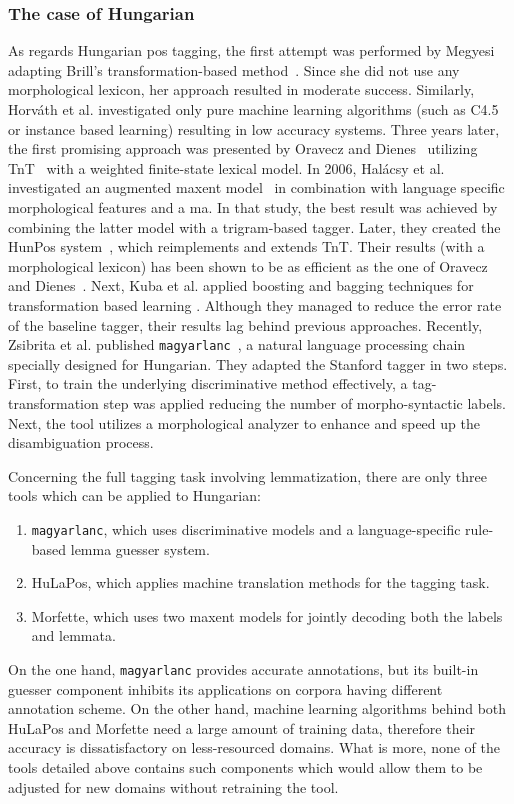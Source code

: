 \subsubsection{The case of Hungarian}

As regards Hungarian \gls{pos} tagging, the first attempt was performed by Megyesi~\cite{Megyesi1998} adapting Brill’s transformation-based method~\cite{Brill1992}. 
Since she did not use any morphological lexicon, her approach resulted in moderate success.
Similarly, Horváth et al. investigated \cite{Horvath1999} only pure machine learning algorithms (such as C4.5 or instance based learning) resulting in low accuracy systems.
Three years later, the first promising approach was presented by Oravecz and Dienes~\cite{Oravecz2002a} utilizing TnT~\cite{Brants2000} with a weighted finite-state lexical model.
In 2006, Halácsy et al. investigated an augmented \acrshort{maxent} model~\cite{Halacsy2006} in combination with language specific morphological features and a \acrshort{ma}.
In that study, the best result was achieved by combining the latter model with a trigram-based tagger.
Later, they created the HunPos system~\cite{Halacsy2007}, which reimplements and extends TnT.
Their results (with a morphological lexicon) has been shown to be as efficient as the one of Oravecz and Dienes~\cite{Oravecz2002a}.
Next, Kuba et al. applied boosting and bagging techniques for transformation based learning \cite{Kuba2004}.
Although they managed to reduce the error rate of the baseline tagger, their results lag behind previous approaches.
Recently, Zsibrita et al. published \texttt{magyarlanc}~\cite{zsibrata2013magyarlanc}, a natural language processing chain specially designed for Hungarian.
They adapted the Stanford tagger \cite{Toutanova2003} in two steps. 
First, to train the underlying discriminative method effectively, a tag-transformation step was applied reducing the number of morpho-syntactic labels.
Next, the tool utilizes a morphological analyzer to enhance and speed up the disambiguation process.

Concerning the full tagging task involving lemmatization, there are only three tools which can be applied to Hungarian:
\begin{enumerate}
	\item \texttt{magyarlanc}, which uses discriminative models and a language-specific rule-based lemma guesser system.
	\item HuLaPos, which applies machine translation methods for the tagging task. 
	\item Morfette, which uses two \acrlong{maxent} models for jointly decoding both the labels and lemmata.
\end{enumerate}
On the one hand, \texttt{magyarlanc} provides accurate annotations, but its built-in guesser component inhibits its applications on corpora having different annotation scheme. 
On the other hand, machine learning algorithms behind both HuLaPos and Morfette need a large amount of training data, therefore their accuracy is dissatisfactory on less-resourced domains.
What is more, none of the tools detailed above contains such components which would allow them to be adjusted for new domains without retraining the tool.

